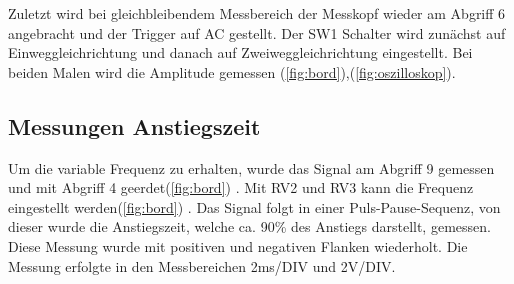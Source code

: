 \noindent
Zuletzt wird bei gleichbleibendem Messbereich der Messkopf wieder am Abgriff 6 angebracht und der Trigger auf AC gestellt. Der SW1 Schalter wird zunächst auf Einweggleichrichtung und danach auf Zweiweggleichrichtung eingestellt. Bei beiden Malen wird die Amplitude gemessen
(\ref{fig:bord}),(\ref{fig:oszilloskop}).
\subsection{Messungen Anstiegszeit}
Um die variable Frequenz zu erhalten, wurde das Signal am Abgriff 9 gemessen und mit Abgriff 4 geerdet(\ref{fig:bord})
. Mit RV2 und RV3 kann die Frequenz eingestellt werden(\ref{fig:bord})
. Das Signal folgt in einer Puls-Pause-Sequenz, von dieser wurde die Anstiegszeit, welche ca. 90\% des Anstiegs darstellt, gemessen. Diese Messung wurde mit positiven und negativen Flanken wiederholt. Die Messung erfolgte in den Messbereichen 2ms/DIV und 2V/DIV. 

\printbibliography{}
